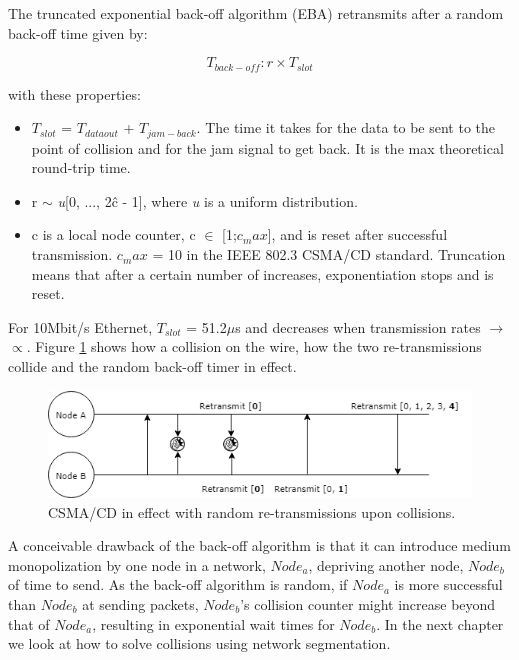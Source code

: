 The truncated exponential back-off algorithm (EBA) retransmits after a random back-off time given by:

\[ T_{back-off}: r \times T_{slot} \]

with these properties:

\begin{itemize}
	\item $T_{slot}$ = $T_{dataout}$ + $T_{jam-back}$. The time it takes for the data to be sent to the point of collision and for the jam signal to get back. It is the max theoretical round-trip time.
	\item r $\sim$ \textit{u}[0, ..., 2\^{c} - 1], where \textit{u} is a uniform distribution.
	\item c is a local node counter, c $\in$ [1;$c_max$], and is reset after successful transmission. $c_max$ = 10 in the IEEE 802.3 CSMA/CD standard. Truncation means that after a certain number of increases, exponentiation stops and is reset.
\end{itemize}

For 10Mbit/s Ethernet, $T_{slot}$ = 51.2$\mu$s and decreases when transmission rates $\longrightarrow$ $\propto$. Figure \ref{fig:csmacd} shows how a collision on the wire, how the two re-transmissions collide and the random back-off timer in effect.

\begin{figure}[h!]\label{}
	\centering
	\includegraphics[scale=0.5]{realTimeEthernet/CSMACD.png}
	\caption{CSMA/CD in effect with random re-transmissions upon collisions.}
	\label{fig:csmacd}
\end{figure}

A conceivable drawback of the back-off algorithm is that it can introduce medium monopolization by one node in a network, $Node_{a}$, depriving another node, $Node_{b}$ of time to send. As the back-off algorithm is random, if $Node_{a}$ is more successful than $Node_{b}$ at sending packets, $Node_{b}$'s collision counter might increase beyond that of $Node_{a}$, resulting in exponential wait times for $Node_{b}$. In the next chapter we look at how to solve collisions using network segmentation.


